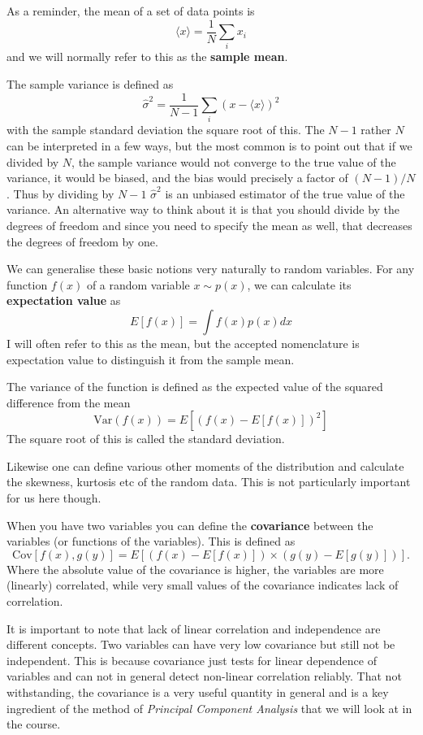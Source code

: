 \documentclass[a4paper,10pt]{article}
\begin{document}
As a reminder, the mean of a set of data points is $$\langle x \rangle = \frac{1}{N} \sum_i x_i $$ and we will normally refer to this as the \textbf{sample mean}.

The sample variance is defined as
$$\hat{\sigma}^2 = \frac{1}{N-1} \sum_i \left(x-\langle x \rangle\right)^2$$
with the sample standard deviation the square root of this. The $N-1$ rather $N$ can be interpreted in a few ways, but the most common is to point out that if we divided by $N$, the sample variance would not converge to the true value of the variance, it would be biased, and the bias would precisely a factor of $(N-1)/N$. Thus by dividing by $N-1$  $\hat{\sigma}^2$ is an unbiased estimator of the true value of the variance. An alternative way to think about it is that you should divide by the degrees of freedom and since you need to specify the mean as well, that decreases the degrees of freedom by one.

We can generalise these basic notions very naturally to random variables. 
For any function $f(x)$ of a random variable $x\sim p(x)$, we can calculate its \textbf{expectation value} as 
$$E\left[f(x)\right] = \int f(x) p(x) dx$$
I will often refer to this as the mean, but the accepted nomenclature is expectation value to distinguish it from the sample mean. 

The variance of the function is defined as the expected value of the squared difference from the mean
$$\mathrm{Var}(f(x)) = E\left[(f(x)-E\left[f(x)\right])^2\right] $$
The square root of this is called the standard deviation.

Likewise one can define various other moments of the distribution and calculate the skewness, kurtosis etc of the random data. This is not particularly important for us here though.

When you have two variables you can define the \textbf{covariance} between the variables (or functions of the variables). This is defined as
$$\mathrm{Cov}\left[f(x), g(y)\right] = E\left[ \left( f(x) - E\left[f(x)\right] \right) \times \left( g(y) - E\left[g(y)\right] \right)\right]. $$
Where the absolute value of the covariance is higher, the variables are more (linearly) correlated, while very small values of the covariance indicates lack of correlation.

It is important to note that lack of linear correlation and independence are different concepts. Two variables can have very low covariance but still not be independent. This is because covariance just tests for linear dependence of variables and can not in general detect non-linear correlation reliably. That not withstanding, the covariance is a very useful quantity in general and is a key ingredient of the method of \textit{Principal Component Analysis} that we will look at in the course.
\end{document}
